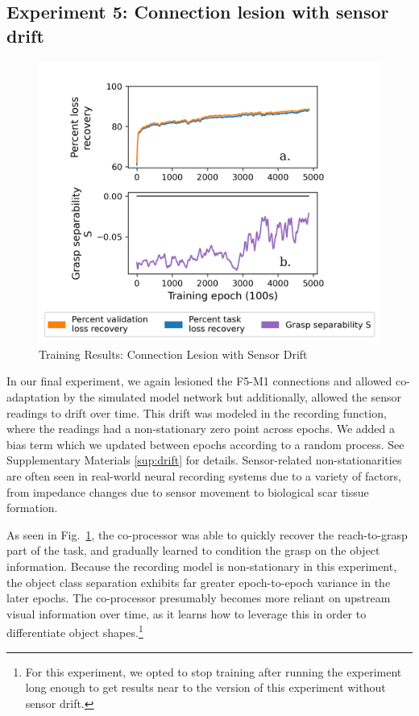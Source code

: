 \documentclass[12pt]{iopart}
\begin{document}
\subsection{Experiment 5: Connection lesion with sensor drift}
\begin{figure}[h]
\centering
\includegraphics[scale=1]{training_results_drift.png}
\caption{Training Results: Connection Lesion with Sensor Drift}
\label{fig:results_drift}
\end{figure}

In our final experiment, we again lesioned the F5-M1 connections and allowed co-adaptation by the
simulated model network but additionally, allowed the sensor readings to drift over time. This
drift was modeled in the recording function, where the readings had a non-stationary zero point
across epochs. We added a bias term which we updated between epochs according to a random process.
See Supplementary Materials \ref{sup:drift} for details. Sensor-related non-stationarities are
often seen in real-world neural recording systems due to a variety of factors, 
from impedance changes due to sensor movement to biological scar tissue formation. 

As seen in Fig.~\ref{fig:results_drift}, the co-processor was able to quickly 
recover the reach-to-grasp part of the task, and gradually learned to
condition the grasp on the object information. Because the recording model is non-stationary
in this experiment, the object class separation exhibits far greater epoch-to-epoch
variance in the later epochs. The co-processor presumably becomes more
reliant on upstream visual information over time, as it learns how to leverage this
in order to differentiate object shapes.\footnote{For this experiment, we opted to stop training
after running the experiment long enough to get results near to the version
of this experiment without sensor drift.}
\end{document}
